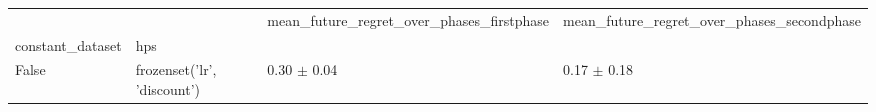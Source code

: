 \begin{tabular}{llll}
\toprule
 &  & mean_future_regret_over_phases_firstphase & mean_future_regret_over_phases_secondphase \\
constant_dataset & hps &  &  \\
\midrule
False & frozenset({'lr', 'discount'}) & 0.30 $\pm$ 0.04 & 0.17 $\pm$ 0.18 \\
\cline{1-4}
\bottomrule
\end{tabular}
